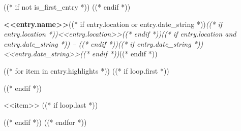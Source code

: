 ((* if not is_first_entry *))
\vspace{<<design.margins.entry_area.vertical_between>>}
((* endif *))

\begin{onecolentry}
    \textbf{<<entry.name>>}((* if entry.location or entry.date_string *))\hfill \textit{((* if entry.location *))<<entry.location>>((* endif *))((* if entry.location and entry.date_string *)) -- ((* endif *))((* if entry.date_string *))<<entry.date_string>>((* endif *))}((* endif *))
\end{onecolentry}

((* for item in entry.highlights *))
    ((* if loop.first *))
\vspace{<<design.margins.highlights_area.top>>}
\begin{onecolentry}
    \begin{highlights}
    ((* endif *))
        \item <<item>>
    ((* if loop.last *))
    \end{highlights}
\end{onecolentry}
    ((* endif *))
((* endfor *))
